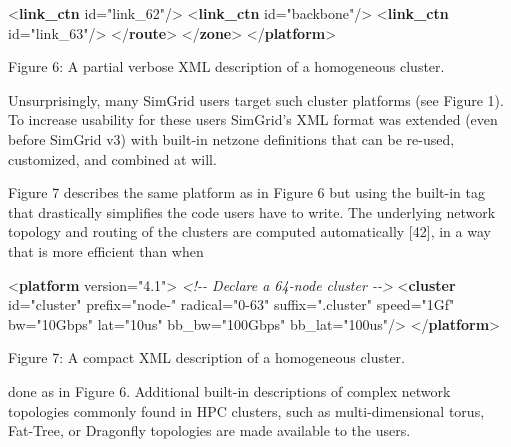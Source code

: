 \documentclass[
]{article}
\newenvironment{Shaded}{}{}
\newcommand{\CommentTok}[1]{\textcolor[rgb]{0.38,0.63,0.69}{\textit{#1}}}
\newcommand{\KeywordTok}[1]{\textcolor[rgb]{0.00,0.44,0.13}{\textbf{#1}}}
\newcommand{\NormalTok}[1]{#1}
\newcommand{\OtherTok}[1]{\textcolor[rgb]{0.00,0.44,0.13}{#1}}
\newcommand{\StringTok}[1]{\textcolor[rgb]{0.25,0.44,0.63}{#1}}
\begin{document}
\begin{Shaded}
\begin{Highlighting}[]
\NormalTok{    \textless{}}\KeywordTok{link\_ctn} \OtherTok{id=}\StringTok{"link\_62"}\NormalTok{/\textgreater{}}
\NormalTok{    \textless{}}\KeywordTok{link\_ctn} \OtherTok{id=}\StringTok{"backbone"}\NormalTok{/\textgreater{}}
\NormalTok{    \textless{}}\KeywordTok{link\_ctn} \OtherTok{id=}\StringTok{"link\_63"}\NormalTok{/\textgreater{}}
\NormalTok{    \textless{}/}\KeywordTok{route}\NormalTok{\textgreater{}}
\NormalTok{    \textless{}/}\KeywordTok{zone}\NormalTok{\textgreater{}}
\NormalTok{\textless{}/}\KeywordTok{platform}\NormalTok{\textgreater{} }
\end{Highlighting}
\end{Shaded}

Figure 6: A partial verbose XML description of a homogeneous cluster.

Unsurprisingly, many SimGrid users target such cluster platforms (see
Figure 1). To increase usability for these users SimGrid's XML format
was extended (even before SimGrid v3) with built-in netzone definitions
that can be re-used, customized, and combined at will.

Figure 7 describes the same platform as in Figure 6 but using the
built-in tag that drastically simplifies the code users have to write.
The underlying network topology and routing of the clusters are computed
automatically {[}42{]}, in a way that is more efficient than when

\begin{Shaded}
\begin{Highlighting}[]
\NormalTok{\textless{}}\KeywordTok{platform} \OtherTok{version=}\StringTok{"4.1"}\NormalTok{\textgreater{}}
    \CommentTok{\textless{}!{-}{-} Declare a 64{-}node cluster {-}{-}\textgreater{}}
\NormalTok{    \textless{}}\KeywordTok{cluster} \OtherTok{id=}\StringTok{"cluster"} \OtherTok{prefix=}\StringTok{"node{-}"} \OtherTok{radical=}\StringTok{"0{-}63"} \OtherTok{suffix=}\StringTok{".cluster"} \OtherTok{speed=}\StringTok{"1Gf"} \OtherTok{bw=}\StringTok{"10Gbps"} \OtherTok{lat=}\StringTok{"10us"} \OtherTok{bb\_bw=}\StringTok{"100Gbps"} \OtherTok{bb\_lat=}\StringTok{"100us"}\NormalTok{/\textgreater{}}
\NormalTok{\textless{}/}\KeywordTok{platform}\NormalTok{\textgreater{} }
\end{Highlighting}
\end{Shaded}

Figure 7: A compact XML description of a homogeneous cluster.

done as in Figure 6. Additional built-in descriptions of complex network
topologies commonly found in HPC clusters, such as multi-dimensional
torus, Fat-Tree, or Dragonfly topologies are made available to the
users.
\end{document}
